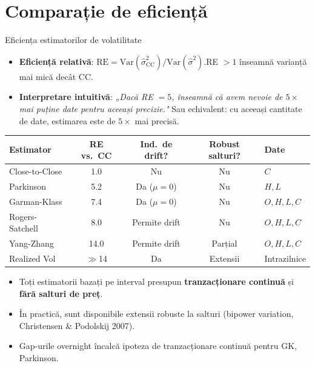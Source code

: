 \documentclass[9pt, aspectratio=169, t]{beamer}
\theoremstyle{definition}
\newcommand{\Var}{\text{Var}}
\begin{document}
\section{Comparație de eficiență}

\begin{frame}{Eficiența estimatorilor de volatilitate}
\begin{itemize}
    \item \textbf{Eficiență relativă}: $\text{RE} = \Var(\hat{\sigma}^2_{\text{CC}}) / \Var(\hat{\sigma}^2)$.\quad RE $> 1$ înseamnă varianță mai mică decât CC.
    \item \textbf{Interpretare intuitivă}: \textit{„Dacă RE $= 5$, înseamnă că avem nevoie de $5\times$ mai puține date pentru aceeași precizie."} Sau echivalent: cu aceeași cantitate de date, estimarea este de $5\times$ mai precisă.
\end{itemize}
\vspace{0.1cm}
\begin{center}
{\small
\renewcommand{\arraystretch}{1.25}
\begin{tabular}{lcccl}
\toprule
\textbf{Estimator} & \textbf{RE vs.\ CC} & \textbf{Ind.\ de drift?} & \textbf{Robust salturi?} & \textbf{Date} \\
\midrule
Close-to-Close & 1.0 & Nu & Nu & $C$ \\
Parkinson & 5.2 & Da ($\mu=0$) & Nu & $H,L$ \\
Garman-Klass & 7.4 & Da ($\mu=0$) & Nu & $O,H,L,C$ \\
Rogers-Satchell & 8.0 & \textcolor{Forest}{Permite drift} & Nu & $O,H,L,C$ \\
Yang-Zhang & 14.0 & \textcolor{Forest}{Permite drift} & Parțial & $O,H,L,C$ \\
Realized Vol & $\gg$14 & Da & Extensii & Intrazilnice \\
\bottomrule
\end{tabular}
}
\end{center}
\vspace{0.1cm}
\begin{itemize}
    \item Toți estimatorii bazați pe interval presupun \textbf{tranzacționare continuă} și \textbf{fără salturi de preț}.
    \item În practică, sunt disponibile extensii robuste la salturi (bipower variation, Christensen \& Podolskij 2007).
    \item Gap-urile overnight încalcă ipoteza de tranzacționare continuă pentru GK, Parkinson.
\end{itemize}
\end{frame}
\end{document}

